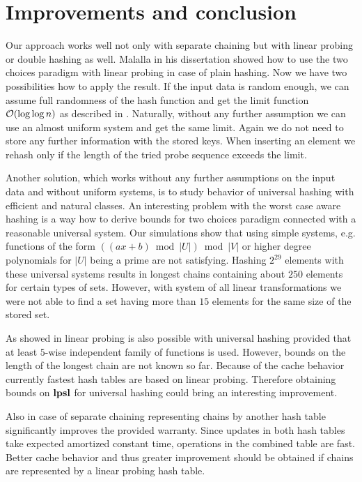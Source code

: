 \section{Improvements and conclusion}
\label{section-conclusion}
Our approach works well not only with separate chaining but with linear probing or double hashing as well.
Malalla in his dissertation \cite{Malalla:2004:THS:1124034} showed how to use the two choices paradigm with linear probing in case of plain hashing.
Now we have two possibilities how to apply the result.
If the input data is random enough, we can assume full randomness of the hash function and get the limit function $\mathcal{O}(\log \log n)$ as described in \cite{DBLP:conf/soda/MitzenmacherV08} . 
Naturally, without any further assumption we can use an almost uniform system and get the same limit.
Again we do not need to store any further information with the stored keys.
When inserting an element we rehash only if the length of the tried probe sequence exceeds the limit.

Another solution, which works without any further assumptions on the input data and without uniform systems, is to study behavior of universal hashing with efficient and natural classes. 
An interesting problem with the worst case aware hashing is a way how to derive bounds for two choices paradigm connected with a reasonable universal system.
Our simulations show that using simple systems, e.g. functions of the form $((ax + b) \bmod |U|) \bmod |V|$ or higher degree polynomials for $|U|$ being a prime are not satisfying. 
Hashing $2^{29}$ elements with these universal systems results in longest chains containing about $250$ elements for certain types of sets. 
However, with system of all linear transformations we were not able to find a set having more than $15$ elements for the same size of the stored set.

As showed in \cite{DBLP:conf/alenex/ThorupZ10} linear probing is also possible with universal hashing provided that at least $5$-wise independent family of functions is used.
However, bounds on the length of the longest chain are not known so far.
Because of the cache behavior currently fastest hash tables are based on linear probing.
Therefore obtaining bounds on $\mathbf{lpsl}$ for universal hashing could bring an interesting improvement.

Also in case of separate chaining representing chains by another hash table significantly improves the provided warranty.
Since updates in both hash tables take expected amortized constant time, operations in the combined table are fast.
Better cache behavior and thus greater improvement should be obtained if chains are represented by a linear probing hash table.
